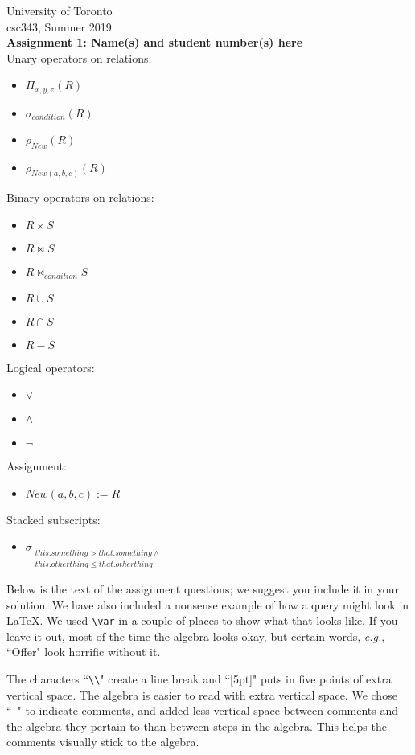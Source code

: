 \documentclass{article}
\newcommand{\var}[1]{\mathit{#1}}
\begin{document}
\noindent
University of Toronto\\
{\sc csc}343, Summer 2019\\[10pt]
{\LARGE\bf Assignment 1: Name(s) and student number(s) here} \\[10pt]

\noindent
Unary operators on relations:
\begin{itemize}
\item $\Pi_{x, y, z} (R)$
\item $\sigma_{condition} (R) $
\item $\rho_{New} (R) $
\item $\rho_{New(a, b, c)} (R) $
\end{itemize}
Binary operators on relations:
\begin{itemize}
\item $R \times S$
\item $R \bowtie S$
\item $R \bowtie_{condition} S$
\item $R \cup S$
\item $R \cap S$
\item $R - S$
\end{itemize}
Logical operators:
\begin{itemize}
\item $\vee$
\item $\wedge$
\item $\neg$
\end{itemize}
Assignment:
\begin{itemize}
\item $New(a, b, c) := R$
\end{itemize}
Stacked subscripts:
\begin{itemize}
\item
$\sigma_{\substack{this.something > that.something \wedge \\ this.otherthing \leq that.otherthing}}$
\end{itemize}

\noindent
Below is the text of the assignment questions; we suggest you include it in your solution.
We have also included a nonsense example of how a query might look in LaTeX.  
We used \verb|\var| in a couple of places to show what that looks like.  
If you leave it out, most of the time the algebra looks okay, but certain words,
{\it e.g.}, ``Offer" look horrific without it.

The characters ``\verb|\\|" create a line break and ``[5pt]" puts in 
five points of extra vertical space.  The algebra is easier to read with extra
vertical space.
We chose ``--" to indicate comments, and added less vertical space between comments
and the algebra they pertain to than between steps in the algebra.
This helps the comments visually stick to the algebra.
\end{document}
